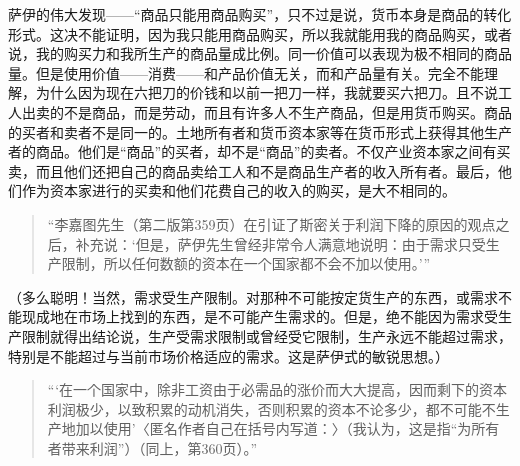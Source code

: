 萨伊的伟大发现——“商品只能用商品购买”，只不过是说，货币本身是商品的转化形式。这决不能证明，因为我只能用商品购买，所以我就能用我的商品购买，或者说，我的购买力和我所生产的商品量成比例。同一价值可以表现为极不相同的商品量。但是使用价值——消费——和产品价值无关，而和产品量有关。完全不能理解，为什么因为现在六把刀的价钱和以前一把刀一样，我就要买六把刀。且不说工人出卖的不是商品，而是劳动，而且有许多人不生产商品，但是用货币购买。商品的买者和卖者不是同一的。土地所有者和货币资本家等在货币形式上获得其他生产者的商品。他们是“商品”的买者，却不是“商品”的卖者。不仅产业资本家之间有买卖，而且他们还把自己的商品卖给工人和不是商品生产者的收入所有者。最后，他们作为资本家进行的买卖和他们花费自己的收入的购买，是大不相同的。

\begin{quote}{“李嘉图先生（第二版第359页）在引证了斯密关于利润下降的原因的观点之后，补充说：‘但是，萨伊先生曾经非常令人满意地说明：由于需求只受生产限制，所以任何数额的资本在一个国家都不会不加以使用。’”}\end{quote}

（多么聪明！当然，需求受生产限制。对那种不可能按定货生产的东西，或需求不能现成地在市场上找到的东西，是不可能产生需求的。但是，绝不能因为需求受生产限制就得出结论说，生产受需求限制或曾经受它限制，生产永远不能超过需求，特别是不能超过与当前市场价格适应的需求。这是萨伊式的敏锐思想。）

\begin{quote}{“‘在一个国家中，除非工资由于必需品的涨价而大大提高，因而剩下的资本利润极少，以致积累的动机消失，否则积累的资本不论多少，都不可能不生产地加以使用’〈匿名作者自己在括号内写道：〉（我认为，这是指“为所有者带来利润”）（同上，第360页）。”}\end{quote}

